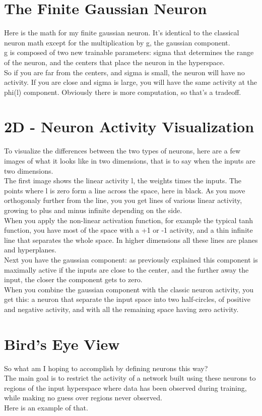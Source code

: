 \documentclass{article}
\begin{document}
\section{The Finite Gaussian Neuron}
Here is the math for my finite gaussian neuron. It's identical to the classical neuron math except for the multiplication by g, the gaussian component.\\
g is composed of two new trainable parameters: sigma that determines the range of the neuron, and the centers that place the neuron in the hyperspace.\\
So if you are far from the centers, and sigma is small, the neuron will have no activity. If you are close and sigma is large, you will have the same activity at the phi(l) component.
Obviously there is more computation, so that's a tradeoff.

\section{2D - Neuron Activity Visualization}
To visualize the differences between the two types of neurons, here are a few images of what it looks like in two dimensions, that is to say when the inputs are two dimensions.\\
The first image shows the linear activity l, the weights times the inputs. The points where l is zero form a line across the space, here in black. As you move orthogonaly further from the line, you you get lines of various linear activity, growing to plus and minus infinite depending on the side.\\
When you apply the non-linear activation function, for example the typical tanh function, you have most of the space with a +1 or -1 activity, and a thin infinite line that separates the whole space. In higher dimensions all these lines are planes and hyperplanes.\\
Next you have the gaussian component: as previously explained this component is maximally active if the inputs are close to the center, and the further away the input, the closer the component gets to zero.\\
When you combine the gaussian component with the classic neuron activity, you get this: a neuron that separate the input space into two half-circles, of positive and negative activity, and with all the remaining space having zero activity.\\

\section{Bird's Eye View}
So what am I hoping to accomplish by defining neurons this way?\\
The main goal is to restrict the activity of a network built using these neurons to regions of the input hyperspace where data has been observed during training, while making no guess over regions never observed.\\
Here is an example of that.
\end{document}
